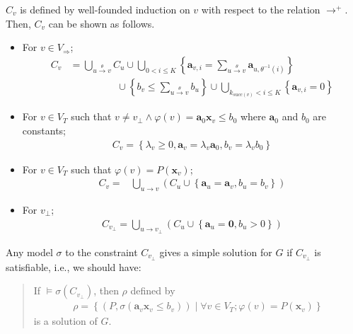 \documentclass[a4paper,12pt]{article}
\newcommand{\edge}[2]{#1\rightarrow#2}
\newcommand{\edgel}[3]{#1\xrightarrow{#2}#3}
\begin{document}
$C_v$ is defined by well-founded induction on $v$ with respect to the
relation $\rightarrow^+$. Then, $C_v$ can be shown as follows.
\begin{itemize}
\item For $v \in V_\Rightarrow$;
\begin{align*}
C_v & =
 \bigcup_{\edgel{u}{\theta}{v}} C_u \cup
 \bigcup_{0 < i \leq K}
 \left\lbrace
  \mathbf{a}_{v,i} = \sum_{\edgel{u}{\theta}{v}} \mathbf{a}_{u, \theta^{-1} (i)}
 \right\rbrace \\
 & \hspace{2cm} \cup
 \left\lbrace
  b_v \leq \sum_{\edgel{u}{\theta}{v}} b_u
 \right\rbrace \cup
 \bigcup_{k_{succ(v)} < i \leq K}
 \left\lbrace \mathbf{a}_{v,i} = 0 \right\rbrace
\end{align*}
\item For $v \in V_T$ such that
  $v \neq v_{\bot} \wedge \varphi(v) = \mathbf{a}_0 \mathbf{x}_v \leq b_0$
  where $\mathbf{a}_0$ and $b_0$ are constants;
\begin{align*}
C_v =
\left\lbrace
 \lambda_v \geq 0, \mathbf{a}_v = \lambda_v \mathbf{a}_0,
 b_v = \lambda_v b_0
\right\rbrace
\end{align*}
\item For $v \in V_T$ such that $\varphi(v) = P(\mathbf{x}_v)$;
\begin{align*}
C_v = & \bigcup_{\edge{u}{v}} \left( C_{u} \cup
\left\lbrace \mathbf{a}_u = \mathbf{a}_v, b_u = b_v \right\rbrace
\right)
\end{align*}
\item For $v_\bot$;
\begin{align*}
C_{v_\bot} = \bigcup_{\edge{u}{v_\bot}} \left( C_{u} \cup
\left\lbrace \mathbf{a}_u = \mathbf{0}, b_u > 0 \right\rbrace \right)
\end{align*}
\end{itemize}

Any model $\sigma$ to the constraint $C_{v_\bot}$ gives a simple
solution for $G$ if $C_{v_\bot}$ is satisfiable, i.e., we should have:

\begin{quote}
If $\models \sigma(C_{v_\bot})$, then $\rho$ defined by
\begin{align*}
 \rho = \left\lbrace
  \left( P, \sigma(\mathbf{a}_v \mathbf{x}_v \leq b_v) \right) \mid
  \forall v \in V_T; \varphi(v) = P(\mathbf{x}_v)
 \right\rbrace
\end{align*}
is a solution of $G$.
\end{quote}
\end{document}
